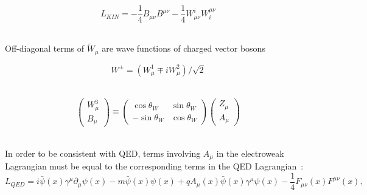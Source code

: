 \\

\begin{equation} \label{eq:L_gauge_kin}
L_{KIN}=-\frac{1}{4}B_{\mu\nu}B^{\mu\nu}-\frac{1}{4}W_{\mu\nu}^i W^{\mu\nu}_i
\end{equation}

\\

Off-diagonal terms of ${\tilde{W}}_\mu$ are wave functions of charged vector bosons 

\begin{equation}\label{eq:Wpm_vs_W12}
W^{\pm}=(W_\mu^1 \mp i W_\mu^2)/{\sqrt{2}}
\end{equation} 

 \\

\begin{equation}\label{eq:W3B_vs_ZA}
  \begin{pmatrix} W_\mu^3 \\ B_\mu \end{pmatrix} \equiv
  \begin{pmatrix} \cos \theta_W & \sin \theta_W \\ -\sin \theta_W & \cos \theta_W \end{pmatrix}
  \begin{pmatrix} Z_\mu \\ A_\mu \end{pmatrix}
\end{equation} 

\\

In order to be consistent with QED, terms involving $A_\mu$ in the electroweak Lagrangian must be equal to the corresponding terms in the QED Lagrangian~\cite{ref_Pich}:\\

\begin{equation}\label{eq:L_QED}
L_{QED} = i \bar{\psi}(x) \gamma^\mu \partial_\mu \psi(x) - m \bar{\psi}(x) \psi(x) + q A_\mu(x) \bar{\psi}(x) \gamma^\mu \psi(x) - \frac{1}{4} F_{\mu\nu}(x) F^{\mu\nu}(x),
\end{equation}

